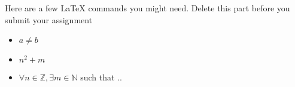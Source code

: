 \documentclass[12pt]{article}
\newcommand{\N}{\mathbb{N}}
\newcommand{\Z}{\mathbb{Z}}
\begin{document}
 Here are a few LaTeX commands you might need. Delete this part before you submit your assignment 
 
 \begin{itemize}
 \item $a \neq b$
 \item $n^2 + m$
 \item $\forall n \in \Z, \exists m \in \N$ such that ..
 \end{itemize}
 
 
\end{document}
